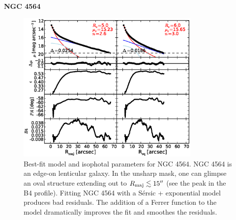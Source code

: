 \documentclass[preprint2]{emulateapj}
\newcommand{\fitfigurewidth}{0.8\textwidth}
\begin{document}
  \clearpage\newpage\noindent
  {\bf NGC 4564 \\}

  \begin{figure}[h]
  \begin{center}
  \includegraphics[width=\fitfigurewidth]{images/n4564_1Dfit.eps}
  \caption{Best-fit model and isophotal parameters for NGC 4564.
  NGC 4564 is an edge-on lenticular galaxy.
  In the unsharp mask, one can glimpse an oval structure extending out to $R_{\rm maj} \lesssim 15''$ (see the peak in the B4 profile).
  Fitting NGC 4564 with a S\'ersic + exponential model produces bad residuals.
  The addition of a Ferrer function to the model dramatically improves the fit and smoothes the residuals.
  }
  \end{center}
  \end{figure}
\end{document}
